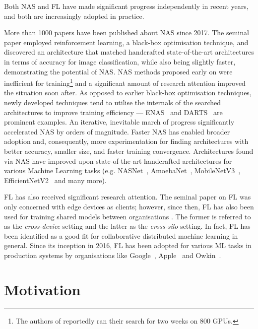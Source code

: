 Both NAS and FL have made significant progress independently in recent years, and both are increasingly adopted in practice.

More than 1000 papers have been published about NAS since 2017. The seminal paper \cite{nas_with_rl_2017} employed reinforcement learning, a black-box optimisation technique, and discovered an architecture that matched handcrafted state-of-the-art architectures in terms of accuracy for image classification, while also being slightly faster, demonstrating the potential of NAS. NAS methods proposed early on were inefficient for training\footnote {The authors of \cite{nas_with_rl_2017} reportedly ran their search for two weeks on 800 GPUs.} and a significant amount of research attention improved the situation soon after. As opposed to earlier black-box optimisation techniques, newly developed techniques tend to utilise the internals of the searched architectures to improve training efficiency — ENAS~\cite{enas_2018} and DARTS~\cite{darts_2019} are prominent examples. An iterative, inevitable march of progress significantly accelerated NAS by orders of magnitude. Faster NAS has enabled broader adoption and, consequently, more experimentation for finding architectures with better accuracy, smaller size, and faster training convergence. Architectures found via NAS have improved upon state-of-the-art handcrafted architectures for various Machine Learning tasks (e.g. NASNet~\cite{nasnet_2018}, AmoebaNet~\cite{amoebanet_2019}, MobileNetV3~\cite{mobilenetv3_2019}, EfficientNetV2~\cite{efficientnetv2_2021} and many more).

FL has also received significant research attention. The seminal paper on FL \cite{fl_seminal_2017} was only concerned with edge devices as clients; however, since then, FL has also been used for training shared models between organisations \cite{fl_multi-institutional_2020} \cite{fl_covid-19_2021} \cite{cross-silo_vertical_horizontal_fl_2022}. The former is referred to as the \textit{cross-device} setting and the latter as the \textit{cross-silo} setting. In fact, FL has been identified as a good fit for collaborative distributed machine learning \cite{cdml_2024} in general. Since its inception in 2016, FL has been adopted for various ML tasks in production systems by organisations like Google~\cite{gboard_fl_2018}, Apple~\cite{apple_fl_case_study_2025} and Owkin~\cite{owkin_fl_drug_discovery_in_prod_2022}.

\section{Motivation}

